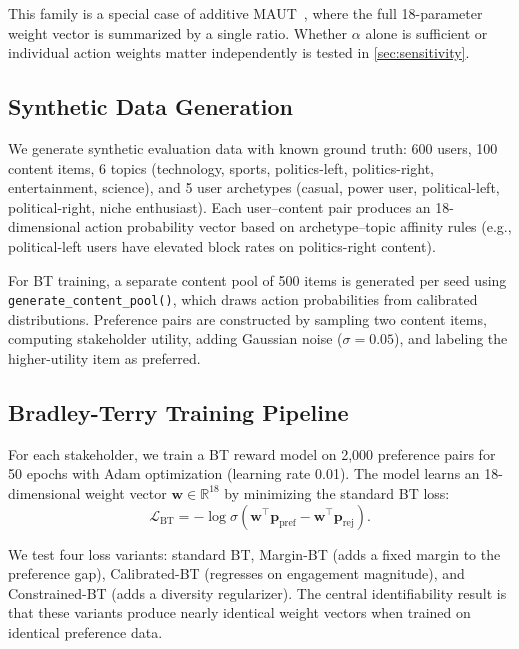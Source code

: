\documentclass[11pt,letterpaper]{article}
\begin{document}
This family is a special case of additive MAUT~\cite{keeney1976decisions},
where the full 18-parameter weight vector is summarized by a single
ratio. Whether $\alpha$ alone is sufficient or individual action
weights matter independently is tested in
\cref{sec:sensitivity}.

\subsection{Synthetic Data Generation}

We generate synthetic evaluation data with known ground truth: 600
users, 100 content items, 6 topics (technology, sports,
politics-left, politics-right, entertainment, science), and 5 user
archetypes (casual, power user, political-left, political-right,
niche enthusiast). Each user--content pair produces an 18-dimensional
action probability vector based on archetype--topic affinity rules
(e.g., political-left users have elevated block rates on
politics-right content).

For BT training, a separate content pool of 500 items is generated
per seed using \texttt{generate\_content\_pool()}, which draws action
probabilities from calibrated distributions. Preference pairs are
constructed by sampling two content items, computing stakeholder
utility, adding Gaussian noise ($\sigma = 0.05$), and labeling the
higher-utility item as preferred.

\subsection{Bradley-Terry Training Pipeline}

For each stakeholder, we train a BT reward model on 2{,}000
preference pairs for 50 epochs with Adam optimization (learning rate
0.01). The model learns an 18-dimensional weight vector
$\mathbf{w} \in \mathbb{R}^{18}$ by minimizing the standard BT loss:
\begin{equation}
  \mathcal{L}_{\text{BT}} = -\log \sigma\!\left(
    \mathbf{w}^\top \mathbf{p}_{\text{pref}}
    - \mathbf{w}^\top \mathbf{p}_{\text{rej}}
  \right).
  \label{eq:btloss}
\end{equation}

We test four loss variants: standard BT, Margin-BT (adds a fixed
margin to the preference gap), Calibrated-BT (regresses on engagement
magnitude), and Constrained-BT (adds a diversity regularizer). The
central identifiability result is that these variants produce nearly
identical weight vectors when trained on identical preference data.
\end{document}
